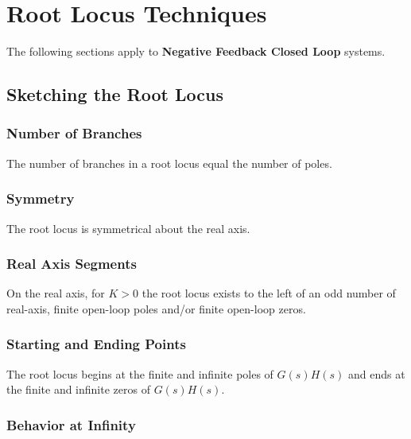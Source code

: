 \documentclass[11pt]{article}
\begin{document}
    \pagebreak


    \section{Root Locus Techniques}

    The following sections apply to \textbf{Negative Feedback Closed Loop} systems.

    \subsection{Sketching the Root Locus}

    \subsubsection{Number of Branches}

    The number of branches in a root locus equal the number of poles.

    \subsubsection{Symmetry}

    The root locus is symmetrical about the real axis.

    \subsubsection{Real Axis Segments}

    On the real axis, for $K > 0$ the root locus exists to the left of an odd number of real-axis, finite open-loop poles and/or finite open-loop zeros.

    \subsubsection{Starting and Ending Points}

    The root locus begins at the finite and infinite poles of $G(s)H(s)$ and ends at the finite and infinite zeros of $G(s)H(s)$.

    \subsubsection{Behavior at Infinity}
\end{document}
